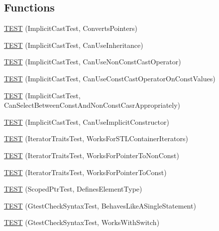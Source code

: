 \subsection*{\-Functions}
\begin{DoxyCompactItemize}
\item 
\hyperlink{namespacetesting_1_1internal_a5d2ec1128c80363b06070f403f682490}{\-T\-E\-S\-T} (\-Implicit\-Cast\-Test, \-Converts\-Pointers)
\item 
\hyperlink{namespacetesting_1_1internal_a1b304dcd3ac71095f2e7d9e9b43c4755}{\-T\-E\-S\-T} (\-Implicit\-Cast\-Test, \-Can\-Use\-Inheritance)
\item 
\hyperlink{namespacetesting_1_1internal_a8554484c7c0ea536bc393c254490aaff}{\-T\-E\-S\-T} (\-Implicit\-Cast\-Test, \-Can\-Use\-Non\-Const\-Cast\-Operator)
\item 
\hyperlink{namespacetesting_1_1internal_af7f631f9fbde27b19a65d50fc29e1420}{\-T\-E\-S\-T} (\-Implicit\-Cast\-Test, \-Can\-Use\-Const\-Cast\-Operator\-On\-Const\-Values)
\item 
\hyperlink{namespacetesting_1_1internal_a62a3b62658f9d47733cb7b5c8f69b2ad}{\-T\-E\-S\-T} (\-Implicit\-Cast\-Test, \-Can\-Select\-Between\-Const\-And\-Non\-Const\-Casr\-Appropriately)
\item 
\hyperlink{namespacetesting_1_1internal_ad5c2cf37cc5aa78744012255cae78f9b}{\-T\-E\-S\-T} (\-Implicit\-Cast\-Test, \-Can\-Use\-Implicit\-Constructor)
\item 
\hyperlink{namespacetesting_1_1internal_abd56ca990c5b8c1aea44d15028a74f33}{\-T\-E\-S\-T} (\-Iterator\-Traits\-Test, \-Works\-For\-S\-T\-L\-Container\-Iterators)
\item 
\hyperlink{namespacetesting_1_1internal_a642234d85836450bb8795cf0a8a9f908}{\-T\-E\-S\-T} (\-Iterator\-Traits\-Test, \-Works\-For\-Pointer\-To\-Non\-Const)
\item 
\hyperlink{namespacetesting_1_1internal_afc0e95a0472d243967fd4720c681c478}{\-T\-E\-S\-T} (\-Iterator\-Traits\-Test, \-Works\-For\-Pointer\-To\-Const)
\item 
\hyperlink{namespacetesting_1_1internal_a99f56e2e9d5b30a879f877cc72bb0c0c}{\-T\-E\-S\-T} (\-Scoped\-Ptr\-Test, \-Defines\-Element\-Type)
\item 
\hyperlink{namespacetesting_1_1internal_a26d00130a017a66d0d60dc5a02a13d25}{\-T\-E\-S\-T} (\-Gtest\-Check\-Syntax\-Test, \-Behaves\-Like\-A\-Single\-Statement)
\item 
\hyperlink{namespacetesting_1_1internal_a4dfd147ff396984fca799878cb53dcea}{\-T\-E\-S\-T} (\-Gtest\-Check\-Syntax\-Test, \-Works\-With\-Switch)

\end{DoxyCompactItemize}
